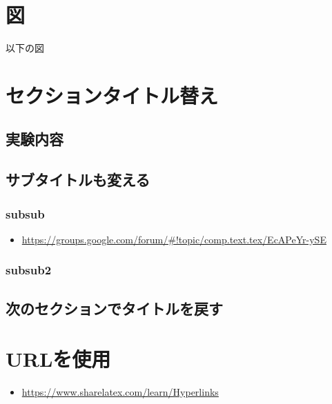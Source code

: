 \documentclass{jsarticle}			%
\begin{document}
	
	\section{図} \label{section図}
		以下の図
		\begin{figure}
		
		\end{figure}
%
	
	\let\oldthesection=\thesection
	\let\oldthesubsection=\thesubsection
	\renewcommand{\thesection}{課題\arabic{section}}
	\renewcommand{\thesubsection}{課題\arabic{section}.\arabic{subsection}}
	\section{セクションタイトル替え} \label{課題1}
		\subsection*{実験内容}
		\subsection{サブタイトルも変える}
			\subsubsection{subsub}
				\begin{itemize}
					\item \url{
						https://groups.google.com/forum/#!topic/comp.text.tex/EcAPeYr-ySE}
				\end{itemize}
			\subsubsection*{subsub2}
		\subsection{次のセクションでタイトルを戻す}

	\let\thesection=\oldthesection
	\let\thesubsection=\oldthesubsection
	\section{URLを使用}
		\begin{itemize}
			\item \url{https://www.sharelatex.com/learn/Hyperlinks}
		\end{itemize}
		
		
\end{document}
